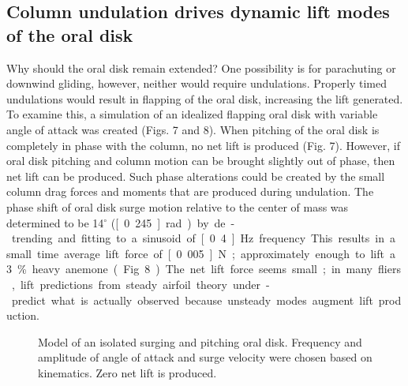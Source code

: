 \documentclass{jeb}
\begin{document}
\subsection{Column undulation drives dynamic lift modes of the oral disk}
	Why should the oral disk remain extended?  One possibility is for parachuting or downwind gliding, however, neither would require undulations.  Properly timed undulations would result in flapping of the oral disk, increasing the lift generated.  To examine this, a simulation of an idealized flapping oral disk with variable angle of attack was created (Figs. 7 and 8).  When pitching of the oral disk is completely in phase with the column, no net lift is produced (Fig. 7).  However, if oral disk pitching and column motion can be brought slightly out of phase, then net lift can be produced.  Such phase alterations could be created by the small column drag forces and moments that are produced during undulation.  The phase shift of oral disk surge motion relative to the center of mass was determined to be 14$^\circ$ (\unit[0.245]{rad}) by de-trending and fitting to a sinusoid of \unit[0.4]{Hz} frequency.  This results in a small time average lift force of \unit[0.005]{N}; approximately enough to lift a 3\% heavy anemone (Fig. 8).  The net lift force seems small; in many fliers, lift predictions from steady airfoil theory under-predict what is actually observed because unsteady modes augment lift production.  
	
\begin{figure}
\caption{Model of an isolated surging and pitching oral disk.  Frequency and amplitude of angle of attack and surge velocity were chosen based on kinematics.  Zero net lift is produced.}
\label{fig:7}
\end{figure}
\end{document}
